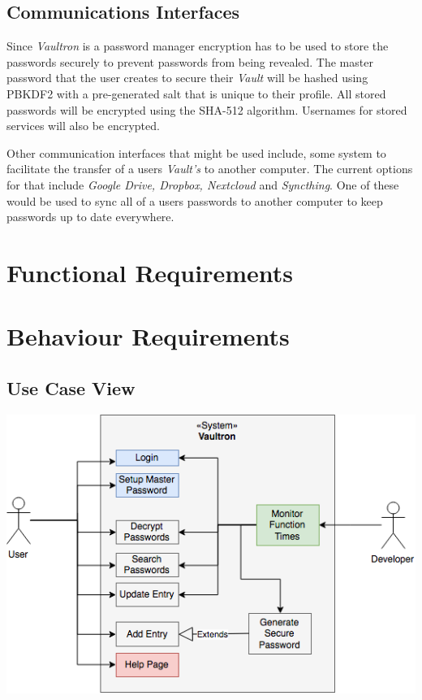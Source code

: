 \documentclass[11pt]{report}
\begin{document}
\subsection{Communications Interfaces}
Since \textit{Vaultron} is a password manager encryption has to be used
to store the passwords securely to prevent passwords from being revealed.
The master password that the user creates to secure their \textit{Vault}
will be hashed using PBKDF2 with a pre-generated salt that is unique to
their profile. All stored passwords will be encrypted using the SHA-512 
algorithm. Usernames for stored services will also be encrypted.


Other communication interfaces that might be used include, some system
to facilitate the transfer of a users \textit{Vault's} to another computer.
The current options for that include \textit{Google Drive, Dropbox, Nextcloud}
and \textit{Syncthing}. One of these would be used to sync all of a users
passwords to another computer to keep passwords up to date everywhere.


\section{Functional Requirements}


\section{Behaviour Requirements}

\subsection{Use Case View}
\begin{center}
\includegraphics[scale=0.72]{use-case.png}
\end{center}
\end{document}
